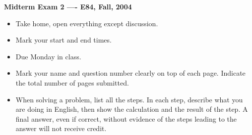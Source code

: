 \usepackage{html}

\begin{center}
{\Large \bf  Midterm Exam 2 ---- E84, Fall, 2004}
\end{center}

\begin{itemize}
\item Take home, open everything except discussion.
\item Mark your start and end times. %
\item Due Monday in class.
\item Mark your name and question number clearly on top of each page.
	Indicate the total number of pages submitted.
\item When solving a problem, list all the steps. In each step, describe 
	what you are doing in English, then show the calculation and the 
	result of the step. A final answer, even if correct, without 
	evidence of the steps leading to the answer will not receive credit.
\end{itemize}

